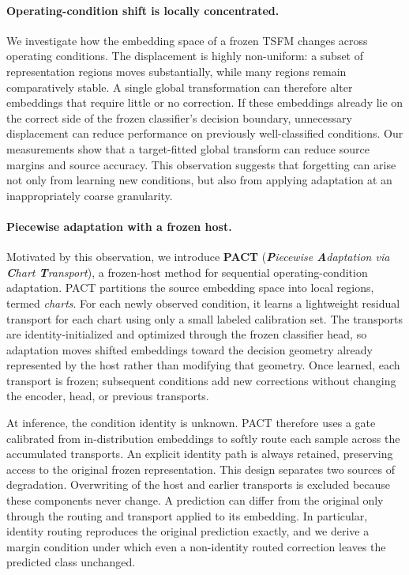\documentclass[letterpaper]{article} %
\begin{document}
\paragraph{Operating-condition shift is locally concentrated.}
We investigate how the embedding space of a frozen TSFM changes across
operating conditions. The displacement is highly non-uniform: a subset
of representation regions moves substantially, while many regions
remain comparatively stable. A single global transformation can
therefore alter embeddings that require little or no correction. If
these embeddings already lie on the correct side of the frozen
classifier's decision boundary, unnecessary displacement can reduce
performance on previously well-classified conditions. Our measurements show
that a target-fitted global transform can reduce source margins and source
accuracy. This observation suggests that forgetting can arise not only from
learning new conditions, but also from applying adaptation at an
inappropriately coarse granularity.

\paragraph{Piecewise adaptation with a frozen host.}
Motivated by this observation, we introduce \textbf{PACT}
(\emph{\textbf{P}iecewise \textbf{A}daptation via \textbf{C}hart
\textbf{T}ransport}), a frozen-host method for sequential
operating-condition adaptation. PACT partitions the source embedding
space into local regions, termed \emph{charts}. For each newly observed
condition, it learns a lightweight residual transport for each chart
using only a small labeled calibration set. The transports are
identity-initialized and optimized through the frozen classifier head,
so adaptation moves shifted embeddings toward the decision geometry
already represented by the host rather than modifying that geometry.
Once learned, each transport is frozen; subsequent conditions add new
corrections without changing the encoder, head, or previous transports.

At inference, the condition identity is unknown. PACT therefore uses a
gate calibrated from in-distribution embeddings to softly route each
sample across the accumulated transports. An explicit identity path is
always retained, preserving access to the original frozen
representation. This design separates two sources of degradation.
Overwriting of the host and earlier transports is excluded because these
components never change. A prediction can differ from the original only
through the routing and transport applied to its embedding. In
particular, identity routing reproduces the original prediction exactly,
and we derive a margin condition under which even a non-identity routed
correction leaves the predicted class unchanged.
\end{document}
